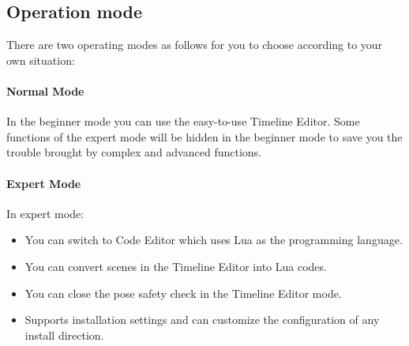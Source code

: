 




\subsection{Operation mode}
There are two operating modes as follows for you to choose according to your own situation:
\paragraph{Normal Mode}
In the beginner mode you can use the easy-to-use Timeline Editor. Some functions of the expert mode will be hidden in the beginner mode to save you the trouble brought by complex and advanced functions.
\paragraph{Expert Mode}
In expert mode:
\begin{itemize}
\item You can switch to Code Editor which uses Lua as the programming language.
\item You can convert scenes in the Timeline Editor into Lua codes.
\item You can close the pose safety check in the Timeline Editor mode.
\item Supports installation settings and can customize the configuration of any install direction.
\end{itemize}


